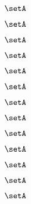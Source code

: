 \begin{forslides}
    \begin{equation}
        \label{eq:slides-translation-67}
        \setA
    \end{equation}

    \begin{equation}
        \label{eq:slides-translation-68}
        \setA
    \end{equation}

    \begin{equation}
        \label{eq:slides-translation-69}
        \setA
    \end{equation}
    
    \begin{equation}
        \label{eq:slides-translation-70}
        \setA
    \end{equation}

    \begin{equation}
        \label{eq:slides-translation-71}
        \setA
    \end{equation}

    \begin{equation}
        \label{eq:slides-translation-72}
        \setA
    \end{equation}

    \begin{equation}
        \label{eq:slides-translation-73}
        \setA
    \end{equation}

    \begin{equation}
        \label{eq:slides-translation-74}
        \setA
    \end{equation}

    \begin{equation}
        \label{eq:slides-translation-75}
        \setA
    \end{equation}

    \begin{equation}
        \label{eq:slides-translation-76}
        \setA
    \end{equation}

    \begin{equation}
        \label{eq:slides-translation-77}
        \setA
    \end{equation}

    \begin{equation}
        \label{eq:slides-translation-78}
        \setA
    \end{equation}

    \begin{equation}
        \label{eq:slides-translation-79}
        \setA
    \end{equation}
    

\end{forslides}
